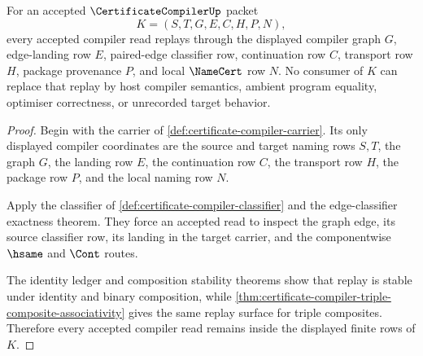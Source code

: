 \begin{theorem}
\label{thm:certificate-compiler-route-replay-scope}
For an accepted $\CertificateCompilerUp$ packet
$$
K=(S,T,G,E,C,H,P,N),
$$
every accepted compiler read replays through the displayed compiler graph $G$, edge-landing row $E$, paired-edge classifier row, continuation row $C$, transport row $H$, package provenance $P$, and local $\NameCert$ row $N$. No consumer of $K$ can replace that replay by host compiler semantics, ambient program equality, optimiser correctness, or unrecorded target behavior.
\end{theorem}
\begin{proof}
Begin with the carrier of \autoref{def:certificate-compiler-carrier}. Its only displayed compiler coordinates are the source and target naming rows $S,T$, the graph $G$, the landing row $E$, the continuation row $C$, the transport row $H$, the package row $P$, and the local naming row $N$.

Apply the classifier of \autoref{def:certificate-compiler-classifier} and the edge-classifier exactness theorem. They force an accepted read to inspect the graph edge, its source classifier row, its landing in the target carrier, and the componentwise $\hsame$ and $\Cont$ routes.

The identity ledger and composition stability theorems show that replay is stable under identity and binary composition, while \autoref{thm:certificate-compiler-triple-composite-associativity} gives the same replay surface for triple composites. Therefore every accepted compiler read remains inside the displayed finite rows of $K$.
\end{proof}

